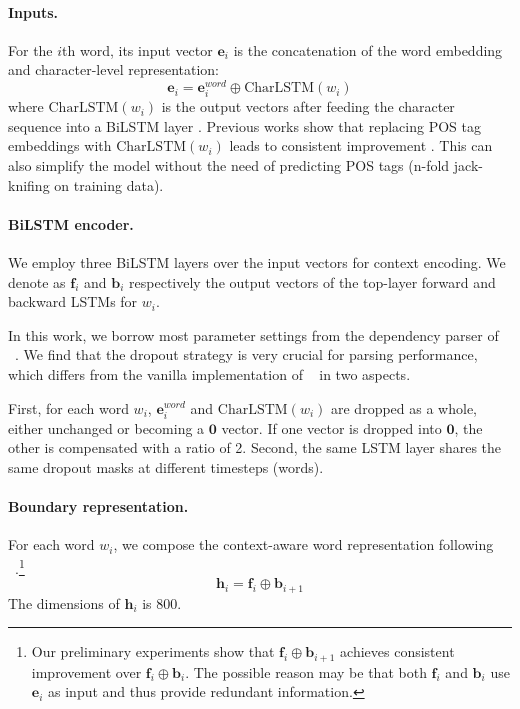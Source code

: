 \documentclass{article}
\begin{document}
\paragraph{Inputs.}
For the $i$th word, its input vector $\mathbf{e}_i$ is the concatenation of the word embedding and character-level representation:
\begin{equation} \label{equation:token-representation}
\mathbf{e}_i = \mathbf{e}^{word}_i \oplus \mathrm{CharLSTM}(w_i)
\end{equation}
where
$\mathrm{CharLSTM}(w_i)$ is the output vectors after feeding the character sequence into a BiLSTM layer \cite{lample-etal-2016-neural}.
Previous works show that replacing POS tag embeddings with $\mathrm{CharLSTM}(w_i)$ leads to consistent improvement \cite{kitaev-klein-2018-constituency}.
This can also simplify the model without the need of predicting POS tags (n-fold jack-knifing on training data).


\paragraph{BiLSTM encoder.}
We employ three BiLSTM layers over the input vectors for context encoding.
We denote as $\mathbf{f}_i$ and $\mathbf{b}_i$ respectively the output vectors of the top-layer forward and backward LSTMs for $w_i$.



In this work, we borrow most parameter settings from the dependency parser of \citeauthor{Timothy-d17-biaffine}~. We find that the dropout strategy is very crucial for parsing performance,
which differs from the vanilla implementation of \citeauthor{stern-etal-2017-minimal}~ in two aspects.

First, for each word $w_i$, $\mathbf{e}^{word}_i$ and $\mathrm{CharLSTM}(w_i)$ are dropped as a whole, either unchanged or becoming a $\mathbf{0}$ vector.
If one vector is dropped into $\mathbf{0}$, the other is compensated with a ratio of 2.
Second, the same LSTM layer shares the same dropout masks at different timesteps (words).





\paragraph{Boundary representation.}

For each word $w_i$, we compose the context-aware word representation following \citeauthor{stern-etal-2017-minimal}~.\footnote{Our preliminary experiments show that $\mathbf{f}_i \oplus \mathbf{b}_{i+1}$ achieves consistent improvement over $\mathbf{f}_i \oplus \mathbf{b}_i$. The possible reason may be that both $\mathbf{f}_i$ and $\mathbf{b}_i$ use $\mathbf{e}_i$ as input and thus provide redundant information.}
\begin{equation}
\mathbf{h}_i = \mathbf{f}_i \oplus \mathbf{b}_{i+1}
\end{equation}
The dimensions of $\mathbf{h}_i$ is 800.
\end{document}
